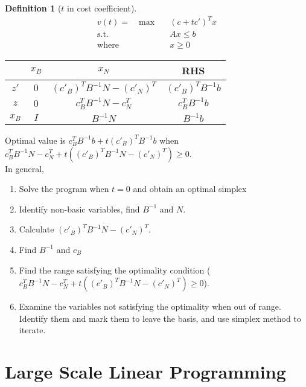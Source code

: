 \documentclass{article}
\theoremstyle{definition}
\newtheorem{definition}{Definition}[section]
\begin{document}
	\break
	\begin{definition}[$t$ in cost coefficient]\hfill
	    \begin{align*}	
			v(t) = \quad\text{max} \quad& (c+tc')^T x\\
			\text{s.t.} \quad& Ax \leq b \\
			\text{where} \quad& x \geq 0
    	\end{align*}
    	
    	\begin{center}
        \begin{tabular}{ | c | c | c | c |} 
    	    \hline
    		& $x_B$ & $x_N$ & RHS \\
    		\hline
    		$z'$ & $0$ & $(c'_B)^TB^{-1}N-(c'_N)^T$ & $(c'_B)^TB^{-1}b$\\
    		\hline
    		$z$ & $0$ & $c_B^TB^{-1}N-c_N^T$ & $c_B^TB^{-1}b$\\
    		\hline
    		$x_B$ & $I$ & $B^{-1}N$ & $B^{-1}b$ \\
    		\hline
    	\end{tabular}
    	\end{center}
    	\hfill
    	
    	\noindent Optimal value is $c_B^TB^{-1}b+t(c'_B)^TB^{-1}b$ when $c_B^TB^{-1}N-c_N^T+t((c'_B)^TB^{-1}N-(c'_N)^T) \geq 0$.\\
    	    	
    	\noindent In general,
    	\begin{enumerate}
    	    \item Solve the program when $t = 0$ and obtain an optimal simplex
    	    \item Identify non-basic variables, find $B^{-1}$ and $N$.
    	    \item Calculate $(c'_B)^TB^{-1}N-(c'_N)^T$.
    	    \item Find $B^{-1}$ and $c_B$
    	    \item Find the range satisfying the optimality condition ($c_B^TB^{-1}N-c_N^T+t((c'_B)^TB^{-1}N-(c'_N)^T) \geq 0$).
    	    \item Examine the variables not satisfying the optimality when out of range. Identify them and mark them to leave the basis, and use simplex method to iterate.
    	\end{enumerate}
	\end{definition}
	
	\break
	\section{Large Scale Linear Programming}
	
\end{document}
